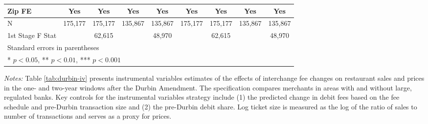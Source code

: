 \documentclass[11pt,english]{article}
\theoremstyle{remark}
\begin{document}
\begin{table}[H]
\begin{centering}
{{\begin{tabular}{l*{8}{c}}
Zip FE              &         Yes         &         Yes         &         Yes         &         Yes         &         Yes         &         Yes         &         Yes         &         Yes         \\
\midrule
N                   &     175,177         &     175,177         &     135,867         &     135,867         &     175,177         &     175,177         &     135,867         &     135,867         \\
1st Stage F Stat    &                     &      62,615         &                     &      48,970         &                     &      62,615         &                     &      48,970         \\
\bottomrule
\multicolumn{9}{l}{ Standard errors in parentheses}\\
\multicolumn{9}{l}{ * \(p<0.05\), ** \(p<0.01\), *** \(p<0.001\)}\\
\end{tabular}
}
 }
\par\end{centering}
\par\textit{Notes: } Table \ref{tab:durbin-iv}
presents instrumental variables estimates of the effects of interchange fee changes on restaurant sales and prices in the one- and two-year windows after the Durbin Amendment. The specification compares merchants in areas with and without large, regulated banks. Key controls for the instrumental variables strategy include (1) the predicted change in debit fees based on the fee schedule and pre-Durbin transaction size and (2) the pre-Durbin debit share. Log ticket size is measured as the log of the ratio of sales to number of transactions and serves as a proxy for prices.
\end{table}

\clearpage
\end{document}
